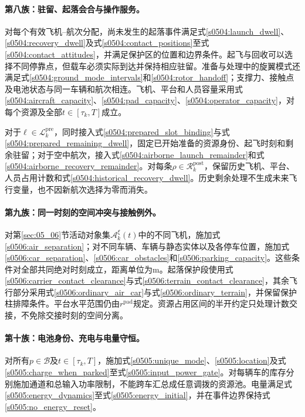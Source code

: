 \paragraph{第八族：驻留、起落会合与操作服务。}
对每个有效飞机--航次分配，尚未发生的起落事件满足式\eqref{s0504:launch_dwell}、\eqref{s0504:recovery_dwell}及式\eqref{s0504:contact_positions}至式\eqref{s0504:contact_attitudes}，并满足保护区的位置和边界条件。起飞与回收可以选择不同停靠点，但载车必须实际到达并保持相应驻留。准备与处理中的旋翼模式还满足式\eqref{s0504:ground_mode_intervals}和\eqref{s0504:rotor_handoff}；支撑力、接触点及电池状态与同一车辆和航次相连。飞机、平台和人员容量采用式\eqref{s0504:aircraft_capacity}、\eqref{s0504:pad_capacity}、\eqref{s0504:operator_capacity}，对每个资源及全部$t\in[\tau_k,T]$成立。

对于$\ell\in\mathcal L_k^{\mathrm{pre}}$，同时接入式\eqref{s0504:prepared_slot_binding}与式\eqref{s0504:prepared_remaining_dwell}，固定已开始准备的资源身份、起飞时刻和剩余驻留；对于空中航次，接入式\eqref{s0504:airborne_launch_remainder}和式\eqref{s0504:airborne_recovery_remainder}。对每条$\rho\in\mathcal R_k^{\mathrm{post}}$，保留历史飞机、平台、人员占用计数和式\eqref{s0504:historical_recovery_dwell}。历史剩余处理不生成未来飞行变量，也不因新航次选择为零而消失。

\paragraph{第九族：同一时刻的空间冲突与接触例外。}
对第\ref{sec:05_06}节活动对象集$\mathcal A_k^\xi(t)$中的不同飞机，施加式\eqref{s0506:air_separation}；对不同车辆、车辆与静态实体以及各停车位置，施加式\eqref{s0506:car_separation}、\eqref{s0506:car_obstacles}和\eqref{s0506:parking_capacity}。这些条件对全部共同绝对时刻成立，距离单位为$\mathrm m$。起落保护段使用式\eqref{s0506:carrier_contact_clearance}与式\eqref{s0506:terrain_contact_clearance}，其余飞行部分采用式\eqref{s0506:ordinary_air_car}与式\eqref{s0506:ordinary_terrain}，并保留保护柱排障条件。平台水平范围仍由$r^{\mathrm{pad}}$规定。资源占用区间的半开约定只处理计数交接，不免除交接时刻的空间分离。

\paragraph{第十族：电池身份、充电与电量守恒。}
对所有$p\in\mathcal B$及$t\in[\tau_k,T]$，施加式\eqref{s0505:unique_mode}、\eqref{s0505:location}及式\eqref{s0505:charge_when_parked}至式\eqref{s0505:input_power_gate}。对每辆车的库存分别施加通道和总输入功率限制，不能跨车汇总成任意调拨的资源池。电量满足式\eqref{s0505:energy_dynamics}至式\eqref{s0505:energy_initial}，并在事件边界保持式\eqref{s0505:no_energy_reset}。

